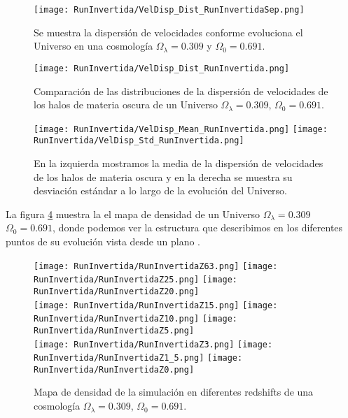 \begin{figure}[H]
    \centering
    \texttt{[image: RunInvertida/VelDisp\_Dist\_RunInvertidaSep.png]}
    \caption[Dispersión de velocidades]{\footnotesize Se muestra la dispersión de velocidades conforme evoluciona el Universo en una cosmología $\Omega_\lambda = 0.309 $ y $\Omega_0 = 0.691$.}
    \label{fig:Invertida-VelDispDistSep}
\end{figure}

\begin{figure}[H]
    \centering
    \texttt{[image: RunInvertida/VelDisp\_Dist\_RunInvertida.png]}
    \caption[Distribución de la dispersión de velocidades]{\footnotesize Comparación de las distribuciones de la dispersión de velocidades de los halos de materia oscura de un Universo $\Omega_\lambda = 0.309 $, $\Omega_0 = 0.691$.}
    \label{fig:Invertida-VelDispDist}
\end{figure}

\begin{figure}[H]
    \centering
    \texttt{[image: RunInvertida/VelDisp\_Mean\_RunInvertida.png]}
    \texttt{[image: RunInvertida/VelDisp\_Std\_RunInvertida.png]}
    \caption[Media y desviación estándar de la dispersión de velocidades]{\footnotesize En la izquierda mostramos la media de la dispersión de velocidades de los halos de materia oscura y en la derecha se muestra su desviación estándar a lo largo de la evolución del Universo.}
    \label{fig:Invertida-VelDispStats}
\end{figure}

La figura \ref{fig:Invertida-DensityMap} muestra la el mapa de densidad de un Universo $\Omega_\lambda = 0.309 $ $\Omega_0 = 0.691$, donde podemos ver la estructura que describimos  en los diferentes puntos de su evolución vista desde un plano .
\begin{figure}[H]
    \centering

    \texttt{[image: RunInvertida/RunInvertidaZ63.png]}   %
    \texttt{[image: RunInvertida/RunInvertidaZ25.png]}   %
    \texttt{[image: RunInvertida/RunInvertidaZ20.png]}   %
    \\
    \texttt{[image: RunInvertida/RunInvertidaZ15.png]}   %
    \texttt{[image: RunInvertida/RunInvertidaZ10.png]}   %
    \texttt{[image: RunInvertida/RunInvertidaZ5.png]}    %
    \\
    \texttt{[image: RunInvertida/RunInvertidaZ3.png]}    %
    \texttt{[image: RunInvertida/RunInvertidaZ1\_5.png]}  %
    \texttt{[image: RunInvertida/RunInvertidaZ0.png]}    %
    \caption[Mapa de densidad en en diferentes redshift]{ \footnotesize Mapa de densidad de la simulación en diferentes redshifts de una cosmología $\Omega_\lambda = 0.309 $, $\Omega_0 = 0.691$. }
    \label{fig:Invertida-DensityMap}
\end{figure}

